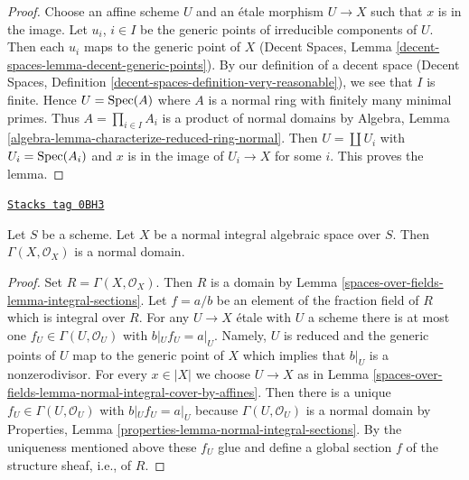 \begin{proof}
Choose an affine scheme $U$ and an \'etale morphism $U \to X$ such that
$x$ is in the image. Let $u_i$, $i \in I$ be the generic points of irreducible
components of $U$. Then each $u_i$ maps to the generic point of $X$
(Decent Spaces, Lemma \ref{decent-spaces-lemma-decent-generic-points}). By
our definition of a decent space
(Decent Spaces, Definition \ref{decent-spaces-definition-very-reasonable}),
we see that $I$ is finite. Hence $U = \operatorname{Spec}(A)$ where $A$ is a normal ring
with finitely many minimal primes.
Thus $A = \prod_{i \in I} A_i$ is a product of normal domains by
Algebra, Lemma \ref{algebra-lemma-characterize-reduced-ring-normal}.
Then $U = \coprod U_i$ with $U_i = \operatorname{Spec}(A_i)$ and $x$ is in the image of
$U_i \to X$ for some $i$. This proves the lemma.
\end{proof}

\begin{lemma}
\label{spaces-over-fields-lemma-normal-integral-sections}
\href{https://stacks.math.columbia.edu/tag/0BH3}{\texttt{Stacks tag 0BH3}}

Let $S$ be a scheme. Let $X$ be a normal integral algebraic space over $S$.
Then $\Gamma(X, \mathcal{O}_X)$ is a normal domain.
\end{lemma}

\begin{proof}
Set $R = \Gamma(X, \mathcal{O}_X)$. Then $R$ is a domain by
Lemma \ref{spaces-over-fields-lemma-integral-sections}.
Let $f = a/b$ be an element of the fraction field of $R$
which is integral over $R$.
For any $U \to X$ \'etale with $U$ a scheme there is at most one
$f_U \in \Gamma(U, \mathcal{O}_U)$ with $b|_U f_U = a|_U$.
Namely, $U$ is reduced and the generic points of $U$ map to
the generic point of $X$ which implies that $b|_U$ is a
nonzerodivisor.
For every $x \in |X|$ we choose $U \to X$ as in
Lemma \ref{spaces-over-fields-lemma-normal-integral-cover-by-affines}.
Then there is a unique $f_U \in \Gamma(U, \mathcal{O}_U)$
with $b|_U f_U = a|_U$ because
$\Gamma(U, \mathcal{O}_U)$ is a normal domain by
Properties, Lemma \ref{properties-lemma-normal-integral-sections}.
By the uniqueness mentioned above these $f_U$
glue and define a global section $f$ of the structure
sheaf, i.e., of $R$.
\end{proof}

